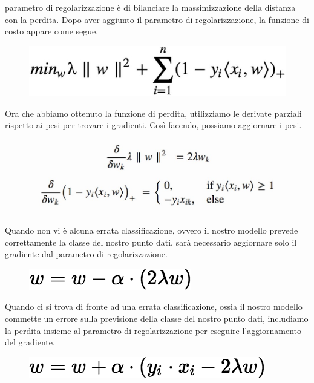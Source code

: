 parametro di regolarizzazione è di bilanciare la massimizzazione della distanza con la perdita. 
Dopo aver aggiunto il parametro di regolarizzazione, la funzione di costo appare come segue.
\begin{figure}
    \begin{center}    
        \includegraphics[width=0.9\linewidth]{images/image31.jpeg}
    \end{center}
\end{figure}
Ora che abbiamo ottenuto la funzione di perdita, utilizziamo le derivate parziali rispetto ai pesi per trovare i gradienti. 
Così facendo, possiamo aggiornare i pesi.
\begin{figure}
    \begin{center}    
        \includegraphics[width=0.9\linewidth]{images/image32.jpeg}
    \end{center}
\end{figure}
Quando non vi è alcuna errata classificazione, ovvero il nostro modello prevede correttamente la classe del nostro punto dati, sarà necessario aggiornare solo il gradiente dal parametro di regolarizzazione.
\begin{figure}
    \begin{center}    
        \includegraphics[width=0.9\linewidth]{images/image33.png}
    \end{center}
\end{figure}
Quando ci si trova di fronte ad una errata classificazione, ossia il nostro modello commette un errore sulla previsione della classe del nostro punto dati, includiamo la perdita insieme al parametro di regolarizzazione per eseguire l'aggiornamento del gradiente.


\begin{figure}
    \begin{center}    
        \includegraphics[width=0.9\linewidth]{images/image34.png}
    \end{center}
\end{figure}